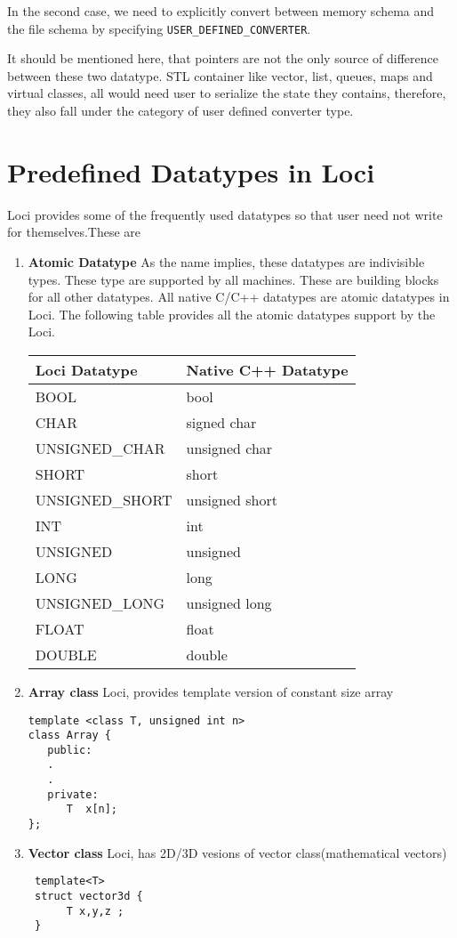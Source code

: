 In the second case, we need to explicitly convert between memory
schema and the file schema by specifying {\tt USER\_DEFINED\_CONVERTER}.

It should be mentioned here, that pointers are not the only source of
difference between these two datatype. STL container like vector,
list, queues, maps and virtual classes, all would need user to
serialize the state they contains, therefore, they also fall under the
category of user defined converter type.


\section {Predefined Datatypes in Loci}
Loci provides some of the frequently used datatypes so that user need
not write for themselves.These are
%
%
\begin{enumerate}
\item {\bf Atomic Datatype}
As the name implies, these datatypes are indivisible types. These type
are supported by all machines. These are building blocks for all other
datatypes. All native C/C++ datatypes are atomic datatypes
in Loci. The following table provides all the atomic datatypes support
by the Loci.
%
\begin{center}
\begin{tabular} [h] {|l|l|} \hline
Loci Datatype & Native C++ Datatype \\ \hline \hline
BOOL & bool \\ \hline
CHAR & signed char \\\hline
UNSIGNED\_CHAR & unsigned char \\\hline
SHORT & short \\\hline
UNSIGNED\_SHORT & unsigned short \\\hline
INT & int \\\hline
UNSIGNED & unsigned \\\hline
LONG & long \\\hline
UNSIGNED\_LONG & unsigned long \\\hline
FLOAT & float \\\hline
DOUBLE & double \\\hline
\end{tabular}
\end{center}
\item {\bf Array class}
Loci, provides template version of constant size array
\begin{verbatim}
template <class T, unsigned int n>
class Array {
   public:
   .
   .
   private:
      T  x[n];
};
\end{verbatim}
\item {\bf Vector class}
Loci, has 2D/3D vesions of vector class(mathematical vectors)
\begin{verbatim}
 template<T>
 struct vector3d {
      T x,y,z ;
 }


\end{verbatim}
\end{enumerate}
